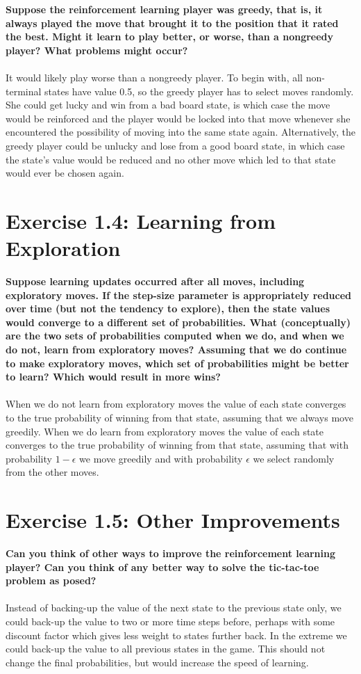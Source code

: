 \documentclass[a4paper,11pt]{article}
\numberwithin{equation}{section}
\theoremstyle{remark}
\begin{document}
\textbf{Suppose the reinforcement learning player was greedy, that is, it always played the move that brought it to the position that it rated the best. Might it learn to play better, or worse, than a nongreedy player? What problems might occur?}
\\ \\
It would likely play worse than a nongreedy player. To begin with, all non-terminal states have value 0.5, so the greedy player has to select moves randomly. She could get lucky and win from a bad board state, is which case the move would be reinforced and the player would be locked into that move whenever she encountered the possibility of moving into the same state again. Alternatively, the greedy player could be unlucky and lose from a good board state, in which case the state's value would be reduced and no other move which led to that state would ever be chosen again.


\section{Exercise 1.4: Learning from Exploration}

\textbf{Suppose learning updates occurred after all moves, including exploratory moves. If the step-size parameter is appropriately reduced over time (but not the tendency to explore), then the state values would converge to a different set of probabilities. What (conceptually) are the two sets of probabilities computed when we do, and when we do not, learn from exploratory moves? Assuming that we do continue to make exploratory moves, which set of probabilities might be better to learn? Which would result in more wins?}
\\ \\
When we do not learn from exploratory moves the value of each state converges to the true probability of winning from that state, assuming that we always move greedily. When we do learn from exploratory moves the value of each state converges to the true probability of winning from that state, assuming that with probability $1-\epsilon$ we move greedily and with probability $\epsilon$ we select randomly from the other moves.

\section{Exercise 1.5: Other Improvements}

\textbf{Can you think of other ways to improve the reinforcement learning player? Can you think of any better way to solve the tic-tac-toe problem as posed?}
\\ \\
Instead of backing-up the value of the next state to the previous state only, we could back-up the value to two or more time steps before, perhaps with some discount factor which gives less weight to states further back. In the extreme we could back-up the value to all previous states in the game. This should not change the final probabilities, but would increase the speed of learning.
\end{document}
